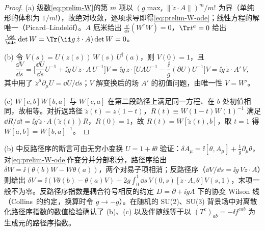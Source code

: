\begin{proof}
(a) 级数\cref{eq:prelim-W}的第 $m$ 项以 $(g\max_s\|\dot z\cdot A\|)^m/m!$ 为界（单纯形的体积为 $1/m!$），故绝对收敛，逐项求导即得\cref{eq:prelim-W-ode}；线性方程的解唯一（Picard--Lindelöf）。$A$ 厄米给出 $\frac{\dd}{\dd s}(W^\dagger W)=0$，$\Tr t^a=0$ 给出 $\frac{\dd}{\dd s}\det W=\Tr(\ii g\,\dot z\cdot A)\det W=0$。

(b) 令 $V(s)=U(z(s))\,W(s)\,U^\dagger(a)$，则 $V(0)=1$，且
\[
\frac{\dd V}{\dd s}=\Big[\frac{\dd U}{\dd s}U^{-1}+\ii g\,U\,\dot z\cdot A\,U^{-1}\Big]V
=\ii g\,\dot z\cdot\Big[UAU^{-1}-\frac{\ii}{g}(\partial U)U^{-1}\Big]V=\ii g\,\dot z\cdot A'\,V ,
\]
其中用了 $\dot z^\mu\partial_\mu U=\dd U/\dd s$；$V$ 解变换后的场 $A'$ 的初值问题，由唯一性 $V=W'$。

(c) $W[c,b]W[b,a]$ 与 $W[c,a]$ 在第二段路径上满足同一方程、在 $b$ 处初值相同，故相等。对折返路径 $\tilde z(t)=z(1-t)$，$R(t)\equiv W(1-t)W(1)^{-1}$ 满足 $\dd R/\dd t=\ii g\,\dot{\tilde z}\cdot A(\tilde z(t))R$，$R(0)=1$，故 $R(t)=W[\tilde z(t),b]$，取 $t=1$ 得 $W[a,b]=W[b,a]^{-1}$。
\end{proof}

(b) 中反路径序的断言可由无穷小变换 $U=1+\ii\theta$ 验证：$\delta A_\mu=\ii[\theta,A_\mu]+\frac1g\partial_\mu\theta$，对\cref{eq:prelim-W-ode}作变分并分部积分，路径序给出 $\delta W=\ii(\theta(b)W-W\theta(a))$，两个对易子项相消；反路径序（$\dd V/\dd s=\ii g\,V\dot z\cdot A$）则给出 $\delta V=\ii(V\theta(b)-\theta(a)V)+2g\int_0^1\dd s\,V(0,s)[\dot z\cdot A,\theta]V(s,1)$，末项一般不为零。反路径序指数是耦合符号相反的约定 $D=\partial+\ii gA$ 下的协变 Wilson 线（Collins~\cite{Collins2011}的约定，换算时令 $g\to-g$）。在随机的 SU(2)、SU(3) 背景场中对离散化路径序指数的数值检验确认了 (b)、(c) 以及伴随线等于以 $(T^c)_{ab}=-\ii f^{cab}$ 为生成元的路径序指数。

